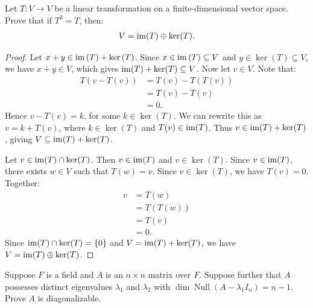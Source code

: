\documentclass[10pt,twoside,openany]{memoir}
\begin{document}
\begin{problem}[F24, P4]
    Let $T:V \rightarrow V$ be a linear transformation on a finite-dimensional vector space. Prove that if $T^2 = T$, then:
        \begin{equation*}
        \begin{split}
            V = \operatorname{im}(T) \oplus \ker (T).
        \end{split}
        \end{equation*}
\end{problem}
    {\color{blue}\begin{proof}
        Let $x+y \in \operatorname{im}{(T)} + \ker{(T)}$. Since $x \in \operatorname{im}{(T)} \subseteq V$ and $y \in \ker{(T)} \subseteq V$, we have $x+y \in V$, which gives $\operatorname{im}(T) + \ker (T) \subseteq V$. Now let $v \in V$. Note that:
            \begin{equation*}
            \begin{split}
                T(v - T(v))
                & = T(v) - T(T(v)) \\
                & = T(v) -  T(v) \\
                & = 0.
            \end{split}
            \end{equation*}
        Hence $v - T(v) = k$, for some $k \in \ker(T)$. We can rewrite this as $v = k + T(v)$, where $k \in \ker(T)$ and $T(v) \in \operatorname{im}(T)$. Thus $v \in \operatorname{im}(T) + \ker (T)$, giving $V \subseteq \operatorname{im}(T) + \ker (T)$.

        Let $v \in \operatorname{im}(T) \cap \ker(T)$. Then $v \in \operatorname{im}(T)$ and $v \in \ker(T)$. Since $v \in \operatorname{im}(T)$, there exists $w \in V$ such that $T(w) = v$. Since $v \in \ker(T)$, we have $T(v) = 0$. Together:
            \begin{equation*}
            \begin{split}
                v 
                & = T(w) \\
                & = T(T(w)) \\
                & = T(v) \\
                & = 0.
            \end{split}
            \end{equation*}
        Since $\operatorname{im}(T) \cap \ker(T) = \{0\}$ and $V = \operatorname{im}(T) + \ker (T)$, we have $V = \operatorname{im}(T) \oplus \ker (T)$.
    \end{proof}}
\begin{problem}[S17, P2]
    Suppose $F$ is a field and $A$ is an $n \times n$ matrix over $F$. Suppose further that $A$ possesses distinct eigenvalues $\lambda_1$ and $\lambda_2$ with $\dim \operatorname{Null}(A - \lambda_1 I_n) = n-1$. Prove $A$ is diagonalizable.
\end{problem}
\end{document}
